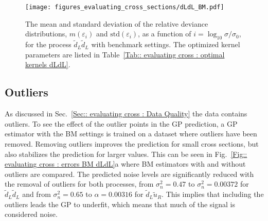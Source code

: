 \documentclass[twoside,english]{uiofysmaster}
\begin{document}
{\begin{figure}
\centering
\texttt{[image: figures\_evaluating\_cross\_sections/dLdL\_BM.pdf]}
\caption{The mean and standard deviation of the relative deviance distributions, $m(\varepsilon_i)$ and $\mathrm{std}(\varepsilon_i)$, as a function of $i = \log_{10} \sigma / \sigma_0$, for the process $\widetilde{d}_L \widetilde{d}_L$ with benchmark settings. The optimized kernel parameters are listed in Table~\ref{Tab:: evaluating cross : optimal kernels dLdL}.}
\label{Fig:: evaluating cross : BM dLdL error plot}
\end{figure}


\subsection{Outliers}


As discussed in Sec.~\ref{Sec:: evaluating cross : Data Quality} the data contains outliers. To see the effect of the outlier points in the GP prediction, a GP estimator with the BM settings is trained on a dataset where outliers have been removed. Removing outliers improves the prediction for small cross sections, but also stabilizes the prediction for larger values. This can be seen in Fig.~\ref{Fig:: evaluating cross : errors BM dLdL}a where BM estimators with and without outliers are compared. The predicted noise levels are significantly reduced with the removal of outliers for both processes, from $\sigma_n^2 = 0.47$ to $\sigma_n^2 = 0.00372$ for $\widetilde{d}_L \widetilde{d}_L$ and from $\sigma_n^2 = 0.65$ to $\alpha= 0.00316$ for $\widetilde{d}_L \widetilde{u}_R$. This implies that including the outliers leads the GP to underfit, which means that much of the signal is considered noise.   




}
\end{document}
